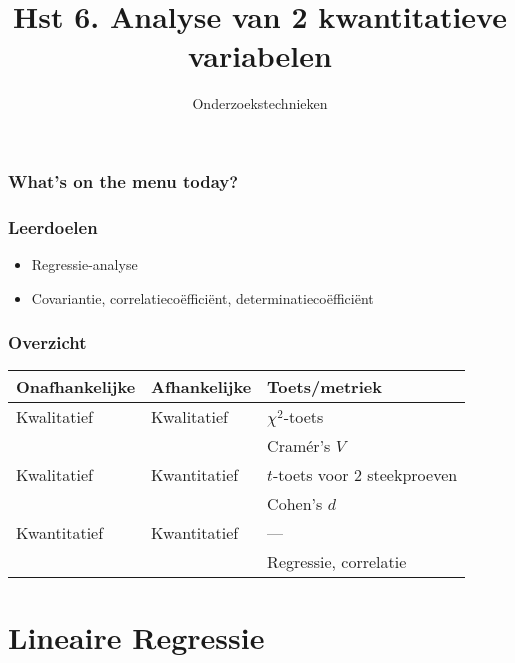 \documentclass[aspectratio=169]{beamer}
\title{Hst 6. Analyse van 2 kwantitatieve variabelen}
\subtitle{Onderzoekstechnieken}
\begin{document}
\begin{frame}
  \maketitle
\end{frame}

\begin{frame}
  \frametitle{What's on the menu today?}
  
  \tableofcontents
\end{frame}

\begin{frame}
  \frametitle{Leerdoelen}
  
  \begin{itemize}
    \item Regressie-analyse
    \item Covariantie, correlatiecoëfficiënt, determinatiecoëfficiënt
  \end{itemize}
\end{frame}

\begin{frame}
  \frametitle{Overzicht}
    \centering
    \begin{tabular}{lll}
    	\toprule
    	\textbf{Onafhankelijke} & \textbf{Afhankelijke} & \textbf{Toets/metriek}        \\
    	\midrule
    	Kwalitatief             & Kwalitatief           & $\chi^2$-toets                \\
    	                        &                       & Cramér's $V$                  \\
    	Kwalitatief             & Kwantitatief          & $t$-toets voor 2 steekproeven \\
    	                        &                       & Cohen's $d$                   \\
    	Kwantitatief            & Kwantitatief          & ---                           \\
    	                        &                       & Regressie, correlatie         \\
    	\bottomrule
    \end{tabular}
\end{frame}

\section{Lineaire Regressie}
\end{document}

